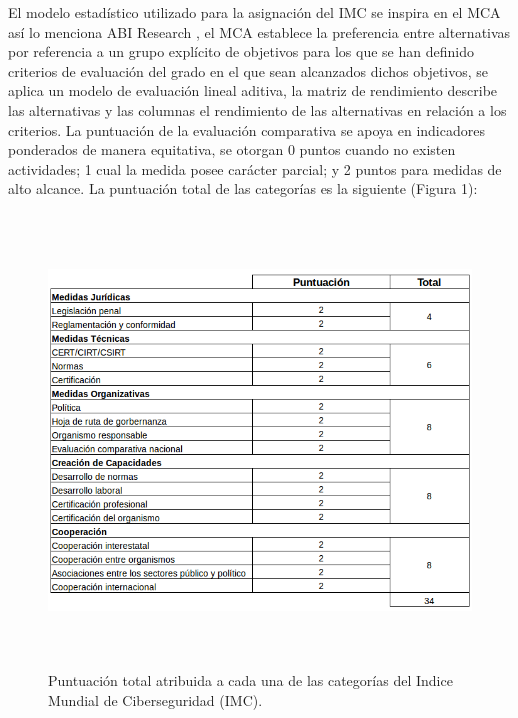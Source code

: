 \documentclass[runningheads,a4paper]{llncs}
\begin{document}
El modelo estadístico utilizado para la asignación del \gls{IMC} se inspira en el \gls{MCA} así lo menciona ABI Research \cite{GCSI_1}, el \gls{MCA} establece la preferencia entre alternativas por referencia a un grupo explícito de objetivos para los que se han definido criterios de evaluación del grado en el que sean alcanzados dichos objetivos, se aplica un modelo de evaluación lineal aditiva, la matriz de rendimiento describe las alternativas y las columnas el rendimiento de las alternativas en relación a los criterios. La puntuación de la evaluación comparativa se apoya en indicadores ponderados de manera equitativa, se otorgan 0 puntos cuando no existen actividades; 1 cual la medida posee carácter parcial; y 2 puntos para medidas de alto alcance. La puntuación total de las categorías es la siguiente (Figura 1):  

\begin{figure}
\centering
\includegraphics[height=12cm, width=12.0cm]{imc_indicadores}
\caption{Puntuación total atribuida a cada una de las categorías del Indice Mundial de Ciberseguridad (IMC).}
\label{fig:example}
\end{figure}
\end{document}
